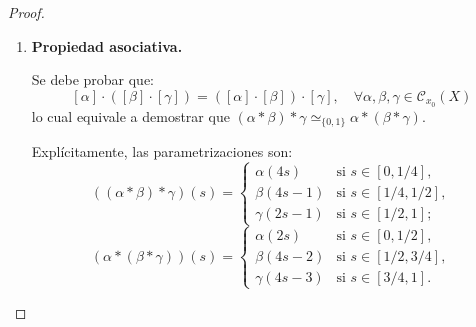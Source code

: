 \begin{proof}
\begin{enumerate}
\begin{itemize}
        \item \emph{Continuidad de $H$:}
        Escribimos $I \times I = B_1 \cup B_2$, donde:
        \[
        B_1 = [0, 1/2] \times I, \qquad B_2 = [1/2, 1] \times I
        \]
        Ambos subconjuntos son cerrados en $I \times I$. Como $H|_{B_1}$ y $H|_{B_2}$ son continuas y coinciden en $B_1 \cap B_2$, por el lema de pegamiento (continuidad a trozos), $H$ es continua.

        \item \emph{Instantes $t = 0$ y $t = 1$:}
        \[
        H_0(s) = H(s, 0) = 
        \begin{cases}
        H^{(1)}(2s, 0) = \alpha(2s) & \text{si } s \in [0, 1/2], \\
        H^{(2)}(2s - 1, 0) = \beta(2s - 1) & \text{si } s \in [1/2, 1],
        \end{cases}
        \implies H_0 = \alpha * \beta
        \]
        \[
        H_1(s) = H(s, 1) = 
        \begin{cases}
        H^{(1)}(2s, 1) = \alpha'(2s) & \text{si } s \in [0, 1/2], \\
        H^{(2)}(2s - 1, 1) = \beta'(2s - 1) & \text{si } s \in [1/2, 1],
        \end{cases}
        \implies H_1 = \alpha' * \beta'
        \]

        \item \emph{Fijación de los extremos ($s = 0$ y $s = 1$):}
        \[
        \begin{aligned}
        H(0, t) &= H^{(1)}(0, t) = x_0, \\
        H(1, t) &= H^{(2)}(1, t) = x_0.
        \end{aligned}
        \]
        No dependen de $t$. En consecuencia, $H : \alpha * \beta \simeq_{\{0,1\}} \alpha' * \beta'$.
    \end{itemize}

    \item \textbf{Propiedad asociativa.}
    
    Se debe probar que:
    \[
    [\alpha] \cdot ([\beta] \cdot [\gamma]) = ([\alpha] \cdot [\beta]) \cdot [\gamma], \quad \forall \alpha, \beta, \gamma \in \mathcal{C}_{x_0}(X)
    \]
    lo cual equivale a demostrar que $(\alpha * \beta) * \gamma \simeq_{\{0,1\}} \alpha * (\beta * \gamma)$.
    
    Explícitamente, las parametrizaciones son:
    \[
    ((\alpha * \beta) * \gamma)(s) = 
    \begin{cases}
    \alpha(4s) & \text{si } s \in [0, 1/4], \\
    \beta(4s - 1) & \text{si } s \in [1/4, 1/2], \\
    \gamma(2s - 1) & \text{si } s \in [1/2, 1];
    \end{cases}
    \]
    \[
    (\alpha * (\beta * \gamma))(s) = 
    \begin{cases}
    \alpha(2s) & \text{si } s \in [0, 1/2], \\
    \beta(4s - 2) & \text{si } s \in [1/2, 3/4], \\
    \gamma(4s - 3) & \text{si } s \in [3/4, 1].
    \end{cases}
    \]
    

\end{enumerate}
\end{proof}
